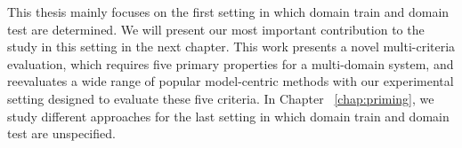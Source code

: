 This thesis mainly focuses on the first setting in which domain train and domain test are determined. We will present our most important contribution to the study in this setting in the next chapter. This work presents a novel multi-criteria evaluation, which requires five primary properties for a multi-domain system, and reevaluates a wide range of popular model-centric methods with our experimental setting designed to evaluate these five criteria. In Chapter ~\ref{chap:priming}, we study different approaches for the last setting in which domain train and domain test are unspecified.






























































































